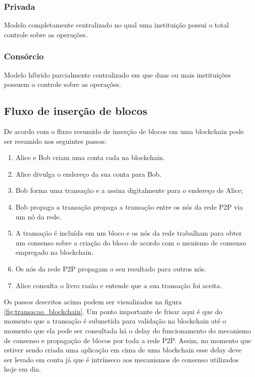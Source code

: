 \documentclass[12pt]{article}
\begin{document}
    \subsubsection{Privada}Modelo completamente centralizado no qual uma instituição possui o total controle sobre as operações.
    \subsubsection{Consórcio}Modelo híbrido parcialmente centralizado em que duas ou mais instituições possuem o controle sobre as operações.
    

\subsection{Fluxo de inserção de blocos}
De acordo com \cite{braga2017segurancca} o fluxo resumido de inserção de blocos em uma blockchain pode ser resumido nos seguintes passos:
\begin{enumerate}
    \item Alice e Bob criam uma conta cada na blockchain.
    \item Alice divulga o endereço da sua conta para Bob.
    \item Bob forma uma transação e a assina digitalmente para o endereço de Alice;
    \item Bob propaga a transação propaga a transação entre os nós da rede P2P via um nó da rede.
    \item A transação é incluída em um bloco e os nós da rede trabalham para obter um consenso sobre a criação do bloco de acordo com o menismo de consenso empregado na blockchain.
    \item Os nós da rede P2P propagam o seu resultado para outros nós.
    \item Alice consulta o livro razão e entende que a sua transação foi aceita.
\end{enumerate}
Os passos descritos acima podem ser visualizados na figura \ref{fig:transacao_blockchain}. Um ponto importante de frisar aqui é que do momento que a transação é submetida para validação na blockchain até o momento que ela pode ser consultada há o delay do funcionamento do mecanismo de consenso e propagação de blocos por toda a rede P2P. Assim, no momento que estiver sendo criada uma aplicação em cima de uma blockchain esse delay deve ser levado em conta já que é intrínseco aos mecanismos de consenso utilizados hoje em dia.
\end{document}
